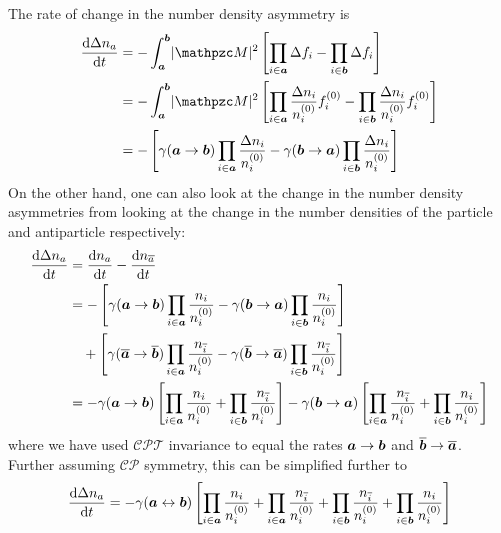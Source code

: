 \documentclass{scrartcl}
\begin{document}
The rate of change in the number density asymmetry is
\begin{equation}
  \begin{aligned}
    \ddfrac{\Delta n_a}{t}
     & = - \int_{\vt a}^{\vt b} \abs{\pzcM}^2 \left[ \prod_{i \in \vt a} \Delta f_i - \prod_{i \in \vt b} \Delta f_i \right]                                                         \\
     & = - \int_{\vt a}^{\vt b} \abs{\pzcM}^2 \left[ \prod_{i \in \vt a} \frac{\Delta n_i}{n_i^{(0)}} f_i^{(0)} - \prod_{i \in \vt b} \frac{\Delta n_i}{n_i^{(0)}} f_i^{(0)} \right] \\
     & = - \left[ \gamma(\vt a \to \vt b) \prod_{i \in \vt a} \frac{\Delta n_i}{n_i^{(0)}} - \gamma(\vt b \to \vt a) \prod_{i \in \vt b} \frac{\Delta n_i}{n_i^{(0)}} \right]
  \end{aligned}
\end{equation}
On the other hand, one can also look at the change in the number density
asymmetries from looking at the change in the number densities of the particle
and antiparticle respectively:
\begin{equation}
  \begin{aligned}
    \frac{\mathop{}\!\mathrm{d}{\Delta n_a}}{\mathop{}\!\mathrm{d}{t}}
     & = \frac{\mathop{}\!\mathrm{d}{n_a}}{\mathop{}\!\mathrm{d}{t}} - \frac{\mathop{}\!\mathrm{d}{n_{\overline a}}}{\mathop{}\!\mathrm{d}{t}}                                                                                                                                                                                  \\
     & = - \left[ \gamma(\boldsymbol{a} \to \boldsymbol{b}) \prod_{i \in \boldsymbol{a}} \frac{n_i}{n_i^{(0)}} - \gamma(\boldsymbol{b} \to \boldsymbol{a}) \prod_{i \in \boldsymbol{b}} \frac{n_i}{n_i^{(0)}} \right]                                                                         \\
     & \quad + \left[ \gamma(\overline{\boldsymbol{a}} \to \overline{\boldsymbol{b}}) \prod_{i \in \boldsymbol{a}} \frac{n_{\overline i}}{n_i^{(0)}} - \gamma(\overline{\boldsymbol{b}} \to \overline{\boldsymbol{a}}) \prod_{i \in \boldsymbol{b}} \frac{n_{\overline i}}{n_i^{(0)}} \right] \\
     & = - \gamma(\boldsymbol{a} \to \boldsymbol{b}) \left[ \prod_{i \in \boldsymbol{a}} \frac{n_i}{n_i^{(0)}} + \prod_{i \in \boldsymbol{b}} \frac{n_{\overline i}}{n_i^{(0)}} \right]
    - \gamma(\boldsymbol{b} \to \boldsymbol{a}) \left[ \prod_{i \in \boldsymbol{a}} \frac{n_{\overline i}}{n_i^{(0)}} + \prod_{i \in \boldsymbol{b}} \frac{n_i}{n_i^{(0)}} \right]
  \end{aligned}
\end{equation}
where we have used \(\mathcal{CPT}\) invariance to equal the rates \(\boldsymbol{a} \to
\boldsymbol{b}\) and \(\overline{\boldsymbol{b}} \to \overline{\boldsymbol{a}}\).  Further assuming
\(\mathcal{CP}\) symmetry, this can be simplified further to
\begin{equation}
  \frac{\mathop{}\!\mathrm{d}{\Delta n_a}}{\mathop{}\!\mathrm{d}{t}} = - \gamma(\boldsymbol{a} \leftrightarrow \boldsymbol{b}) \left[ \prod_{i \in \boldsymbol{a}} \frac{n_i}{n_i^{(0)}} + \prod_{i \in \boldsymbol{a}} \frac{n_{\overline i}}{n_i^{(0)}} + \prod_{i \in \boldsymbol{b}} \frac{n_{\overline i}}{n_i^{(0)}} + \prod_{i \in \boldsymbol{b}} \frac{n_i}{n_i^{(0)}} \right]
\end{equation}
\end{document}
